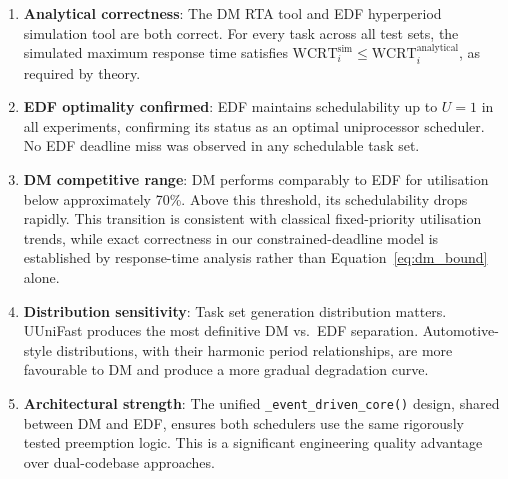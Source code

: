\documentclass[12pt,a4paper]{article}
\begin{document}
\begin{enumerate}
    \item \textbf{Analytical correctness}: The DM RTA tool and EDF hyperperiod simulation tool are both correct. For every task across all test sets, the simulated maximum response time satisfies \(\text{WCRT}_i^{\text{sim}} \leq \text{WCRT}_i^{\text{analytical}}\), as required by theory.

    \item \textbf{EDF optimality confirmed}: EDF maintains schedulability up to \(U = 1\) in all experiments, confirming its status as an optimal uniprocessor scheduler. No EDF deadline miss was observed in any schedulable task set.

    \item \textbf{DM competitive range}: DM performs comparably to EDF for utilisation below approximately 70\%. Above this threshold, its schedulability drops rapidly. This transition is consistent with classical fixed-priority utilisation trends, while exact correctness in our constrained-deadline model is established by response-time analysis rather than Equation~\ref{eq:dm_bound} alone.

    \item \textbf{Distribution sensitivity}: Task set generation distribution matters. UUniFast produces the most definitive DM vs.\ EDF separation. Automotive-style distributions, with their harmonic period relationships, are more favourable to DM and produce a more gradual degradation curve.

    \item \textbf{Architectural strength}: The unified \texttt{\_event\_driven\_core()} design, shared between DM and EDF, ensures both schedulers use the same rigorously tested preemption logic. This is a significant engineering quality advantage over dual-codebase approaches.
\end{enumerate}
\end{document}

